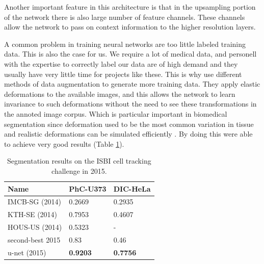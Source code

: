 \documentclass[english, a4paper]{article}
\begin{document}
Another important feature in this architecture is that in the upsampling portion of the network there is also large number of feature channels. These channels allow the network to pass on context information to the higher resolution layers. 

A common problem in training neural networks are too little labeled training data. This is also the case for us. We require a lot of medical data, and personell with the expertise to correctly label our data are of high demand and they usually have very little time for projects like these. This is why \citeauthor*{UNetConvolutional15} use different methods of data augmentation to generate more training data. They apply elastic deformations to the available images, and this allows the network to learn invariance to such deformations without the need to see these transformations in the annoted image corpus. Which is particular important in biomedical segmentation since deformation used to be the most common variation in tissue and realistic deformations can be simulated efficiently \cite{UNetConvolutional15}. By doing this \citeauthor*{UNetConvolutional15} were able to achieve very good results (Table \ref{tab:segmentation_results}).

\begin{table} %
  \centering
  \begin{tabular}{ l l l }
  	\hline
    Name &				PhC-U373 &			DIC-HeLa 		\\
    \hline
    IMCB-SG (2014) &	0.2669 & 			0.2935 			\\
    KTH-SE (2014) &		0.7953 & 			0.4607 			\\ 
    HOUS-US (2014) &	0.5323 & 			- 				\\ 
    second-best 2015 &	0.83 & 				0.46 			\\
    u-net (2015) &		\textbf{0.9203} & 	\textbf{0.7756} \\
    \hline
  \end{tabular}
  \caption{Segmentation results on the ISBI cell tracking challenge in 2015.}
  \label{tab:segmentation_results}
\end{table}
\end{document}
